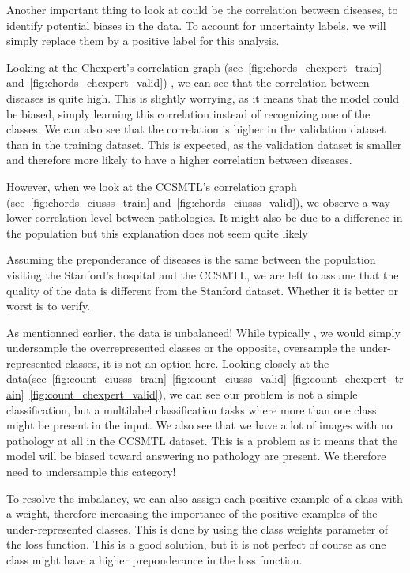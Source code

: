 \documentclass[11pt]{article}
\begin{document}
    Another important thing to look at could be the correlation between diseases, to identify potential biases in the
    data. To account for uncertainty labels, we will simply replace them by a positive label for
    this analysis.

    Looking at the Chexpert's correlation graph (see~\ref{fig:chords_chexpert_train} and~\ref{fig:chords_chexpert_valid}) ,
    we can see that the correlation between diseases is quite high. This is slightly worrying, as it means that the model could be biased, simply
    learning this correlation instead of recognizing one of the classes. We can also see that the correlation is higher in the validation dataset than in the training
    dataset. This is expected, as the validation dataset is smaller and therefore more likely to have a higher correlation
    between diseases.


    However, when we look at the CCSMTL's correlation graph (see~\ref{fig:chords_ciusss_train} and~\ref{fig:chords_ciusss_valid}), we observe a way lower correlation level between pathologies.
    It might also be due to a difference in the population but this explanation does not seem quite likely

    Assuming the preponderance of diseases is the same between the population visiting the Stanford's hospital and
    the CCSMTL, we are left to assume that the quality of the data is different from the Stanford dataset. Whether it is better or worst is to verify.

   

    As mentionned earlier, the data is unbalanced! While typically , we would simply undersample the overrepresented
    classes or the opposite, oversample the under-represented classes, it is not an option here. Looking closely at the data(see~\ref{fig:count_ciusss_train}~\ref{fig:count_ciusss_valid}~\ref{fig:count_chexpert_train}~\ref{fig:count_chexpert_valid}),
    we can see our problem is not a simple classification, but a multilabel classification tasks where more than one class might be present
    in the input. We also see that we have a lot of images with no pathology at all in the CCSMTL dataset. This is a 
    problem as it means that the model will be biased toward answering no pathology are present. We therefore need 
    to undersample this category!


    To resolve the imbalancy, we can also assign each positive example of a class with a weight, therefore increasing the importance of the positive examples of the under-represented classes. This is
    done by using the class weights parameter of the loss function. This is a good solution, but it is not perfect of course as one class might have a higher preponderance in the loss
    function.
\end{document}
